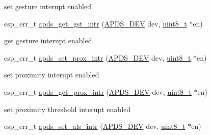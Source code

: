 \begin{DoxyCompactItemize}
\begin{DoxyCompactList}
\begin{DoxyItemize}
\item set gesture interupt enabled 
\end{DoxyItemize}\end{DoxyCompactList}\item 
esp\+\_\+err\+\_\+t \hyperlink{group__APDS9960__InterruptFunctions_ga9916d8429e0e551e80b87d24f76af03a}{apds\+\_\+get\+\_\+gst\+\_\+intr} (\hyperlink{structAPDS9960__Driver}{A\+P\+D\+S\+\_\+\+D\+EV} dev, \hyperlink{vl53l0x__types_8h_aba7bc1797add20fe3efdf37ced1182c5}{uint8\+\_\+t} $\ast$en)
\begin{DoxyCompactList}\small\item\em 
\begin{DoxyItemize}
\item get gesture interupt enabled 
\end{DoxyItemize}\end{DoxyCompactList}\item 
esp\+\_\+err\+\_\+t \hyperlink{group__APDS9960__InterruptFunctions_ga9add3c63fd8e13102600968d13b4662e}{apds\+\_\+set\+\_\+prox\+\_\+intr} (\hyperlink{structAPDS9960__Driver}{A\+P\+D\+S\+\_\+\+D\+EV} dev, \hyperlink{vl53l0x__types_8h_aba7bc1797add20fe3efdf37ced1182c5}{uint8\+\_\+t} $\ast$en)
\begin{DoxyCompactList}\small\item\em 
\begin{DoxyItemize}
\item set proximity interupt enabled 
\end{DoxyItemize}\end{DoxyCompactList}\item 
esp\+\_\+err\+\_\+t \hyperlink{group__APDS9960__InterruptFunctions_ga6292cc16a94b497ba44c65bd75b8fe7d}{apds\+\_\+get\+\_\+prox\+\_\+intr} (\hyperlink{structAPDS9960__Driver}{A\+P\+D\+S\+\_\+\+D\+EV} dev, \hyperlink{vl53l0x__types_8h_aba7bc1797add20fe3efdf37ced1182c5}{uint8\+\_\+t} $\ast$en)
\begin{DoxyCompactList}\small\item\em 
\begin{DoxyItemize}
\item set proximity threshold interupt enabled 
\end{DoxyItemize}\end{DoxyCompactList}\item 
esp\+\_\+err\+\_\+t \hyperlink{group__APDS9960__InterruptFunctions_gae68b39659be80fdb9dcda0b89c98713b}{apds\+\_\+set\+\_\+als\+\_\+intr} (\hyperlink{structAPDS9960__Driver}{A\+P\+D\+S\+\_\+\+D\+EV} dev, \hyperlink{vl53l0x__types_8h_aba7bc1797add20fe3efdf37ced1182c5}{uint8\+\_\+t} $\ast$en)

\end{DoxyCompactItemize}
